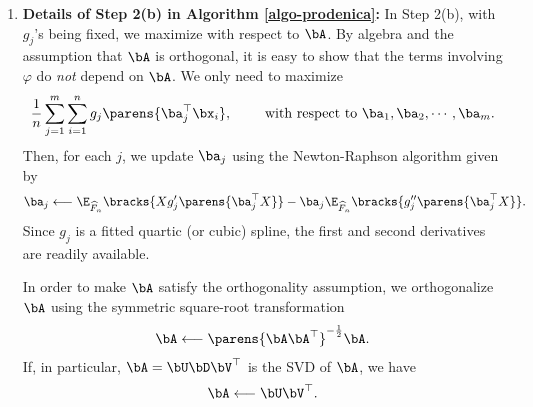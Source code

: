 \documentclass[12pt]{article}
\begin{document}
\begin{enumerate}[label=\textbf{\arabic*.}]
	\item \textbf{Details of Step 2(b) in Algorithm \ref{algo-prodenica}:} In Step 2(b), with $g_j$'s being fixed, we maximize with respect to $\bA$. By algebra and the assumption that $\bA$ is orthogonal, it is easy to show that the terms involving $\varphi$ do \emph{not} depend on $\bA$. We only need to maximize 
	\begin{align*}
		\frac{1}{n} \sum_{j=1}^m \sum_{i=1}^n g_j \parens{\ba_j^\top \bx_i}, \qquad \text{ with respect to } \ba_1, \ba_2, \cdots, \ba_m. 
	\end{align*}
	Then, for each $j$, we update $\ba_j$ using the Newton-Raphson algorithm given by 
	\begin{align*}
		\ba_j \longleftarrow \E_{\widehat{F}_n} \bracks{X g_j' \parens{\ba_{j}^\top X}} - \ba_{j} \E_{\widehat{F}_n} \bracks{ g_j'' \parens{\ba_{j}^\top X}}. 
	\end{align*}
	Since $g_j$ is a fitted quartic (or cubic) spline, the first and second derivatives are readily available.
	
	In order to make $\bA$ satisfy the orthogonality assumption, we orthogonalize $\bA$ using the symmetric square-root transformation 
	\begin{align*}
		\bA \longleftarrow \parens{\bA \bA^\top}^{-\frac{1}{2}} \bA. 
	\end{align*}
	If, in particular, $\bA = \bU \bD \bV^\top$ is the SVD of $\bA$, we have 
	\begin{align*}
		\bA \longleftarrow \bU \bV^\top. 
	\end{align*}
	
	
\end{enumerate}

\printbibliography
\end{document}
